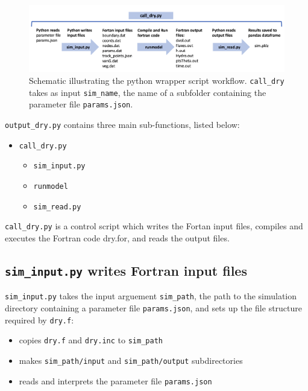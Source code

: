 \documentclass{article}
\newcommand{\code}[1]{\texttt{#1}}
\begin{document}
 \begin{figure}[h]
 \centering
\includegraphics[width=38pc]{grid/schematic.png}
 \caption{Schematic illustrating the python wrapper script workflow. \code{call\_dry} takes as input \code{sim\_name}, the name of a subfolder containing the parameter file \code{params.json}.}
 \label{schematic}
 \end{figure}
 
 
\code{output\_dry.py} contains three main sub-functions, listed below:
 \begin{itemize}
 	\item  \code{call\_dry.py} 
	\begin{itemize}
		\item \code{sim\_input.py} 
		\item \code{runmodel}
		\item \code{sim\_read.py}
	\end{itemize}
 \end{itemize}
 
 \code{call\_dry.py}  is a control script which writes the Fortan input files, compiles and executes the Fortran code dry.for, and reads the output files.

 
\subsection{\code{sim\_input.py} writes Fortran input files}


\code{sim\_input.py} takes the input arguement \code{sim\_path}, the path to the simulation directory containing a parameter file \code{params.json}, and sets up the file structure required by \code{dry.f}:
\begin{itemize}
	\item copies \code{dry.f} and \code{dry.inc} to \code{sim\_path}
	\item makes \code{sim\_path/input} and \code{sim\_path/output} subdirectories
	\item  reads and interprets the parameter file \code{params.json}    
\end{itemize}   
\end{document}
